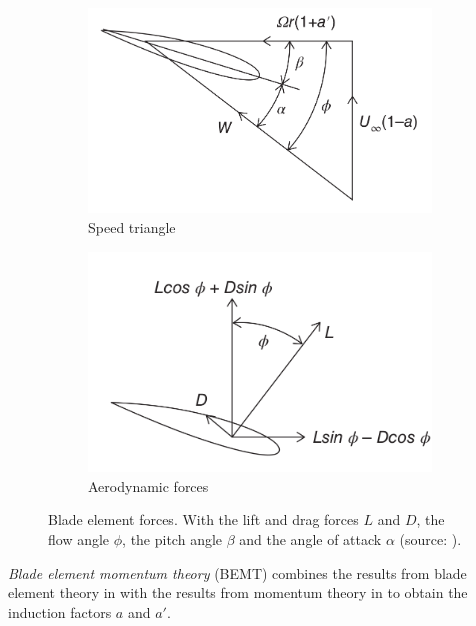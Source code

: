 \begin{figure}[h!]
    \begin{subfigure}[b]{0.5\textwidth}
        \centering
        \includegraphics[height=0.15\textheight]{./part1/figures/speed_triangle.png}
        \caption{Speed triangle}
    \end{subfigure}
    \begin{subfigure}[b]{0.5\textwidth}
        \centering
        \includegraphics[height=0.15\textheight]{./part1/figures/aerodyn_blade.png}
        \caption{Aerodynamic forces}
    \end{subfigure}
    \caption{Blade element forces. With the lift and drag forces $L$ and $D$, the flow angle $\phi$, the pitch angle $\beta$ and the angle of attack $\alpha$ (source: \citet{burton_2021_wind_handbook}).}
    \label{fig:blade_theory}
\end{figure}
\textit{Blade element momentum theory} (BEMT) combines the results from blade element theory in  with the results from momentum theory in  to obtain the induction factors $a$ and $a'$. 
